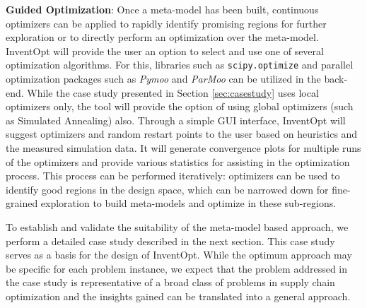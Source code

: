     \textbf{Guided Optimization}: Once a meta-model has been built, continuous optimizers can be applied to rapidly identify promising regions for further exploration or to directly perform an optimization over the meta-model. InventOpt will provide the user an option to select and use one of several optimization algorithms. For this, libraries such as \texttt{scipy.optimize} \cite{2020SciPy-NMeth} and parallel optimization packages such as \textit{Pymoo} \cite{pymoo} and \textit{ParMoo} \cite{chang_2022} can be utilized in the back-end.  While the case study presented in Section \ref{sec:casestudy} uses local optimizers only, the tool will provide the option of using global optimizers (such as Simulated Annealing) also. Through a simple GUI interface, InventOpt will suggest optimizers and random restart points to the user based on heuristics and the measured simulation data. It will generate convergence plots for multiple runs of the optimizers and provide various statistics for assisting in the optimization process. This process can be performed iteratively: optimizers can be used to identify good regions in the design space, which can be narrowed down for fine-grained exploration to build meta-models and optimize in these sub-regions. 
    
    To establish and validate the suitability of the meta-model based approach, we perform a detailed case study described in the next section. This case study serves as a basis for the design of InventOpt. While the optimum approach may be specific for each problem instance, we expect that 
    the problem addressed in the case study is representative of a broad class of problems in supply chain optimization and the insights gained can be translated into a general approach.
    
    
